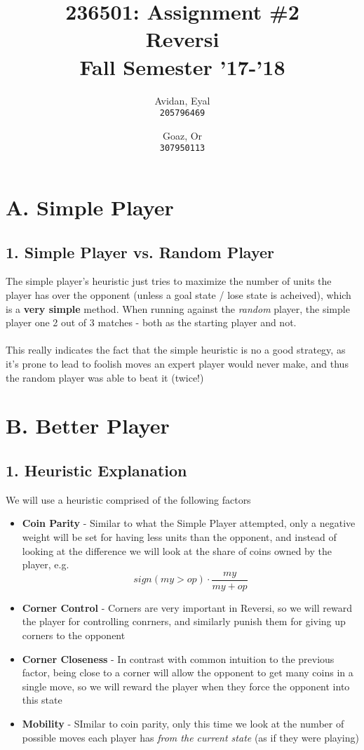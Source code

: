 \documentclass{article}
\begin{document}
\title{%
  236501: Assignment \#2 \\
  \large Reversi \\
    Fall Semester '17-'18}

\author{
  Avidan, Eyal \\
  \texttt{205796469}
  \and
  Goaz, Or \\
  \texttt{307950113}
}

\maketitle

\section*{A. Simple Player}
\subsection*{1. Simple Player vs. Random Player}
The simple player's heuristic just tries to maximize the number of units the player has over the opponent (unless a goal state / lose state is acheived), which is a \textbf{very simple} method. When running against the \emph{random} player, the simple player one 2 out of 3 matches - both as the starting player and not. \\~\\
This really indicates the fact that the simple heuristic is no a good strategy, as it's prone to lead to foolish moves an expert player would never make, and thus the random player was able to beat it (twice!)

\section*{B. Better Player}
\subsection*{1. Heuristic Explanation}
We will use a heuristic comprised of the following factors
\begin{itemize}
\item \textbf{Coin Parity} - Similar to what the Simple Player attempted, only a negative weight will be set for having less units than the opponent, and instead of looking at the difference we will look at the share of coins owned by the player, e.g.
$$
	sign(my > op) \cdot \frac {my}{my + op}
$$
\item \textbf{Corner Control} - Corners are very important in Reversi, so we will reward the player for controlling conrners, and similarly punish them for giving up corners to the opponent
\item \textbf{Corner Closeness} - In contrast with common intuition to the previous factor, being close to a corner will allow the opponent to get many coins in a single move, so we will reward the player when they force the opponent into this state
\item \textbf{Mobility} - SImilar to coin parity, only this time we look at the number of possible moves each player has \emph{from the current state} (as if they were playing)
\end{itemize}
\end{document}
